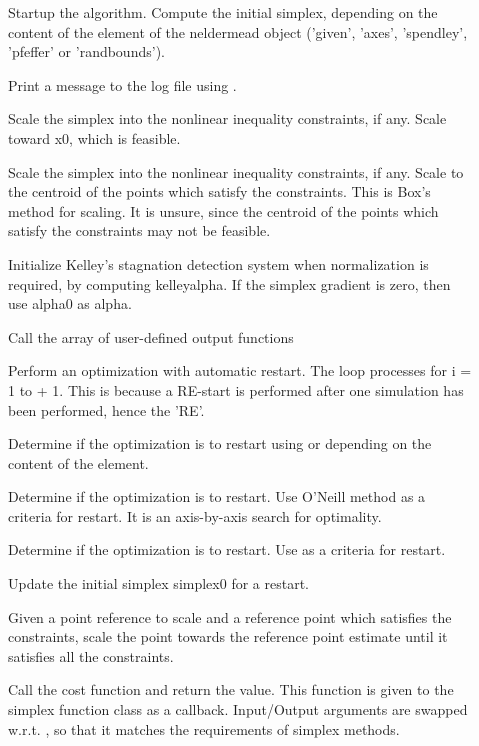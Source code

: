 \begin{Details}\relax
\begin{description}

\item[] Startup the algorithm. Compute the
initial simplex, depending on the content of the 
element of the neldermead object ('given', 'axes', 'spendley', 'pfeffer' or
'randbounds').
\item[] Print a message to the log file using
.
\item[] Scale the simplex into the nonlinear
inequality constraints, if any. Scale toward x0, which is feasible.
\item[] Scale the simplex into the nonlinear
inequality constraints, if any. Scale to the centroid of the points which
satisfy the constraints. This is Box's method for scaling. It is unsure,
since the centroid of the points which satisfy the constraints may not
be feasible.
\item[] Initialize Kelley's stagnation detection
system when normalization is required, by computing kelleyalpha. If the
simplex gradient is zero, then use alpha0 as alpha.
\item[] Call the array of user-defined output
functions
\item[] Perform an optimization with automatic
restart. The loop processes for i = 1 to  + 1. This is
because a RE-start is performed after one simulation has been performed,
hence the 'RE'.
\item[] Determine if the optimization is to
restart using  or 
depending on the content of the  element.
\item[] Determine if the optimization is to
restart. Use O'Neill method as a criteria for restart. It is an axis-by-axis
search for optimality.
\item[] Determine if the optimization is to
restart. Use  as a criteria for restart.
\item[] Update the initial simplex simplex0 for a
restart.
\item[] Given a point reference to scale and a
reference point which satisfies the constraints, scale the point
towards the reference point estimate until it satisfies all the
constraints.
\item[] Call the cost function and return the value.
This function is given to the simplex function class as a callback.
Input/Output arguments are swapped w.r.t. , so that
it matches the requirements of simplex methods.

\end{description}

\end{Details}

